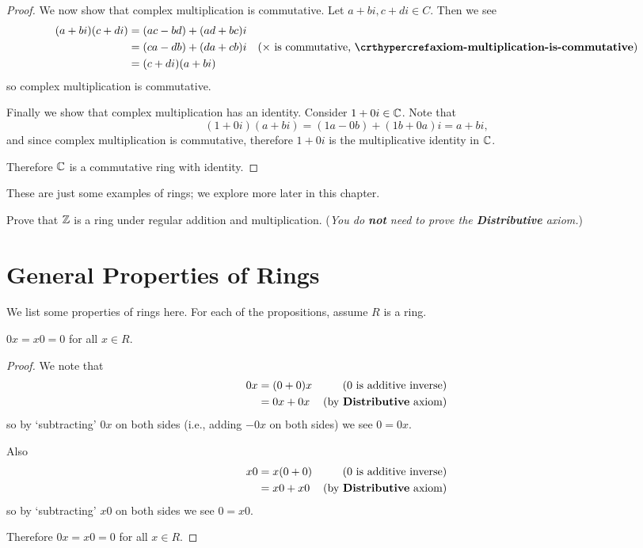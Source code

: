 \begin{proof}
    We now show that complex multiplication is commutative. Let $a+bi, c+di \in C$. Then we see
    \begin{align*}
        (a+bi)(c+di) &= (ac-bd) + (ad+bc)i\\
        &= (ca-db) + (da+cb)i & (\times\text{ is commutative, } \myref{axiom-multiplication-is-commutative})\\
        &= (c+di)(a+bi)
    \end{align*}
    so complex multiplication is commutative.

    Finally we show that complex multiplication has an identity. Consider $1 + 0i \in \mathbb{C}$. Note that
    \[
        (1+0i)(a+bi) = (1a-0b) + (1b+0a)i = a+bi,
    \]
    and since complex multiplication is commutative, therefore $1+0i$ is the multiplicative identity in $\mathbb{C}$.
    
    Therefore $\mathbb{C}$ is a commutative ring with identity.
\end{proof}

These are just some examples of rings; we explore more later in this chapter.
\begin{exercise}\label{exercise-ring-of-integers-is-a-ring}
    Prove that $\mathbb{Z}$ is a ring under regular addition and multiplication.\newline
    (\textit{You do \textbf{not} need to prove the \textbf{Distributive} axiom.})
\end{exercise}

\section{General Properties of Rings}
We list some properties of rings here. For each of the propositions, assume $R$ is a ring.

\begin{proposition}\label{prop-multiplying-by-zero-is-zero}
    $0x = x0 = 0$ for all $x \in R$.
\end{proposition}
\begin{proof}
    We note that
    \begin{align*}
        0x &= (0 + 0)x & (0 \text{ is additive inverse})\\
        &= 0x + 0x & (\text{by \textbf{Distributive} axiom})
    \end{align*}
    so by `subtracting' $0x$ on both sides (i.e., adding $-0x$ on both sides) we see $0 = 0x$.
    
    Also
    \begin{align*}
        x0 &= x(0 + 0) & (0 \text{ is additive inverse})\\
        &= x0 + x0 & (\text{by \textbf{Distributive} axiom})
    \end{align*}
    so by `subtracting' $x0$ on both sides we see $0 = x0$.
    
    Therefore $0x = x0 = 0$ for all $x \in R$.
\end{proof}

